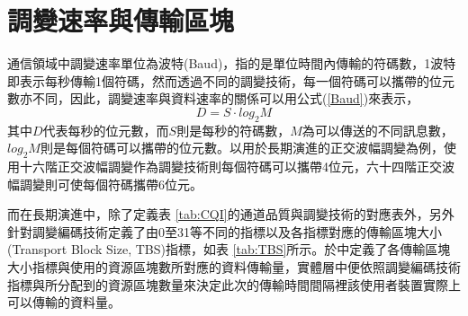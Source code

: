 \section{調變速率與傳輸區塊}
通信領域中調變速率單位為波特(Baud)，指的是單位時間內傳輸的符碼數，1波特即表示每秒傳輸1個符碼，然而透過不同的調變技術，每一個符碼可以攜帶的位元數亦不同，因此，調變速率與資料速率的關係可以用公式(\ref{Baud})來表示，
\begin{equation}
\label{Baud}
D=S\cdot log_2 M
\end{equation}
其中$D$代表每秒的位元數，而$S$則是每秒的符碼數，$M$為可以傳送的不同訊息數，$log_2 M$則是每個符碼可以攜帶的位元數。以用於長期演進的正交波幅調變為例，使用十六階正交波幅調變作為調變技術則每個符碼可以攜帶4位元，六十四階正交波幅調變則可使每個符碼攜帶6位元。

而在長期演進中，除了定義表 \ref{tab:CQI}的通道品質與調變技術的對應表外，另外針對調變編碼技術定義了由0至31等不同的指標以及各指標對應的傳輸區塊大小(Transport Block Size, TBS)指標，如表 \ref{tab:TBS}所示。於\cite{PHY_spec}中定義了各傳輸區塊大小指標與使用的資源區塊數所對應的資料傳輸量，實體層中便依照調變編碼技術指標與所分配到的資源區塊數量來決定此次的傳輸時間間隔裡該使用者裝置實際上可以傳輸的資料量。

